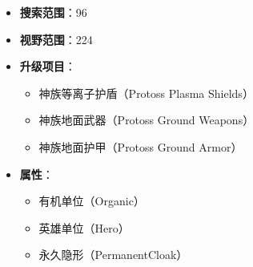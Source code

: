 \begin{tcolorbox}[colback=white, colframe=black!60!white, title=Hero\_Dark\_Templar(), arc=0mm]
\begin{itemize}
        \item \textbf{搜索范围}：96
        \item \textbf{视野范围}：224
        \item \textbf{升级项目}：
            \begin{itemize}
                \item 神族等离子护盾（Protoss Plasma Shields）
                \item 神族地面武器（Protoss Ground Weapons）
                \item 神族地面护甲（Protoss Ground Armor）
            \end{itemize}
        \item \textbf{属性}：
            \begin{itemize}
                \item 有机单位（Organic）
                \item 英雄单位（Hero）
                \item 永久隐形（PermanentCloak）
            \end{itemize}
    \end{itemize}
\end{tcolorbox}

